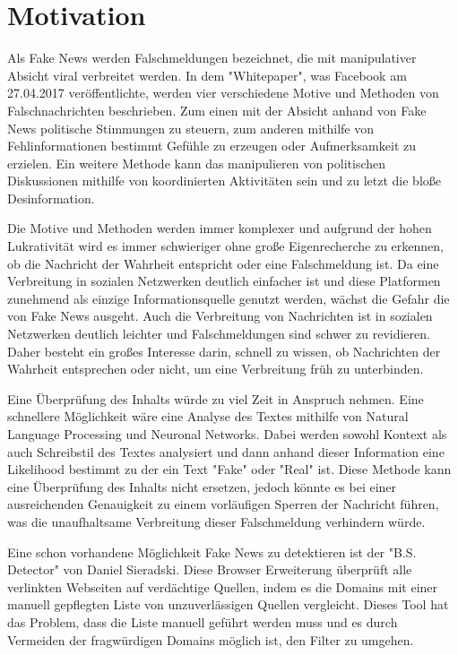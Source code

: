 \chapter{Motivation}

Als Fake News werden Falschmeldungen bezeichnet, die mit manipulativer Absicht viral verbreitet werden. In dem 
"Whitepaper"\cite{facebook}, was Facebook am 27.04.2017 veröffentlichte, werden vier verschiedene Motive und  
Methoden von Falschnachrichten beschrieben. Zum einen mit der Absicht anhand von Fake News politische Stimmungen 
zu steuern, zum anderen mithilfe von Fehlinformationen bestimmt Gefühle zu erzeugen oder Aufmerksamkeit zu erzielen. 
Ein weitere Methode kann das manipulieren von politischen Diskussionen mithilfe von koordinierten Aktivitäten sein und 
zu letzt die bloße Desinformation.

Die Motive und Methoden werden immer komplexer und aufgrund der hohen Lukrativität\cite{Cynk} wird es immer schwieriger 
ohne große Eigenrecherche zu erkennen, ob die Nachricht der Wahrheit entspricht oder eine Falschmeldung ist.
Da eine Verbreitung in sozialen Netzwerken deutlich einfacher ist und diese Platformen zunehmend als einzige
Informationsquelle genutzt werden, wächst die Gefahr die von Fake News ausgeht.
Auch die Verbreitung von Nachrichten ist in sozialen Netzwerken deutlich leichter und Falschmeldungen sind schwer 
zu revidieren. 
Daher besteht ein großes Interesse darin, schnell zu wissen, ob Nachrichten der Wahrheit entsprechen oder nicht, um 
eine Verbreitung früh zu unterbinden. 

Eine Überprüfung des Inhalts würde zu viel Zeit in Anspruch nehmen. Eine schnellere Möglichkeit wäre eine Analyse 
des Textes mithilfe von Natural Language Processing und Neuronal Networks.
Dabei werden sowohl Kontext als auch Schreibstil des Textes analysiert und dann anhand dieser Information eine 
Likelihood bestimmt zu der ein Text "Fake" oder "Real" ist.
Diese Methode kann eine Überprüfung des Inhalts nicht ersetzen, 
jedoch könnte es bei einer ausreichenden Genauigkeit zu einem vorläufigen Sperren der Nachricht führen, was die 
unaufhaltsame Verbreitung dieser Falschmeldung verhindern würde.

Eine schon vorhandene Möglichkeit Fake News zu detektieren ist der "B.S. Detector" von Daniel Sieradski\cite{BS}.
Diese Browser Erweiterung überprüft alle verlinkten Webseiten auf verdächtige Quellen, indem es die Domains 
mit einer manuell gepflegten Liste von unzuverlässigen Quellen vergleicht. Dieses Tool hat das Problem, dass 
die Liste manuell geführt werden muss und es durch Vermeiden der fragwürdigen Domains möglich ist, den Filter zu 
umgehen. 

